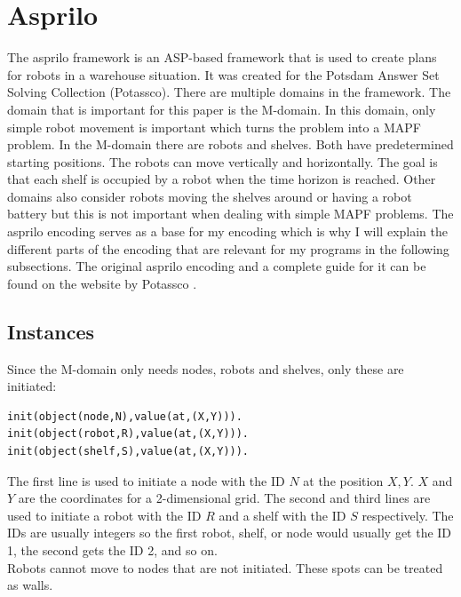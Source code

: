 \documentclass[runningheads]{llncs}
\begin{document}
\section{Asprilo}
The asprilo framework is an ASP-based framework that is used to create plans for robots in a warehouse situation. It was created for the Potsdam Answer Set Solving Collection (Potassco). There are multiple domains in the framework. The domain that is important for this paper is the M-domain. In this domain, only simple robot movement is important which turns the problem into a MAPF problem. In the M-domain there are robots and shelves. Both have predetermined starting positions. The robots can move vertically and horizontally. The goal is that each shelf is occupied by a robot when the time horizon is reached. Other domains also consider robots moving the shelves around or having a robot battery but this is not important when dealing with simple MAPF problems. The asprilo encoding serves as a base for my encoding which is why I will explain the different parts of the encoding that are relevant for my programs in the following subsections. The original asprilo encoding and a complete guide for it can be found on the website by Potassco \cite{asprilo}.
\subsection{Instances}
 Since the M-domain only needs nodes, robots and shelves, only these are initiated:
\begin{verbatim}
init(object(node,N),value(at,(X,Y))).
init(object(robot,R),value(at,(X,Y))).
init(object(shelf,S),value(at,(X,Y))).
\end{verbatim}
The first line is used to initiate a node with the ID $N$ at the position $X, Y$. $X$ and $Y$ are the coordinates for a 2-dimensional grid. The second and third lines are used to initiate a robot with the ID $R$ and a shelf with the ID $S$ respectively. The IDs are usually integers so the first robot, shelf, or node would usually get the ID 1, the second gets the ID 2, and so on. \\
Robots cannot move to nodes that are not initiated. These spots can be treated as walls.
\end{document}
